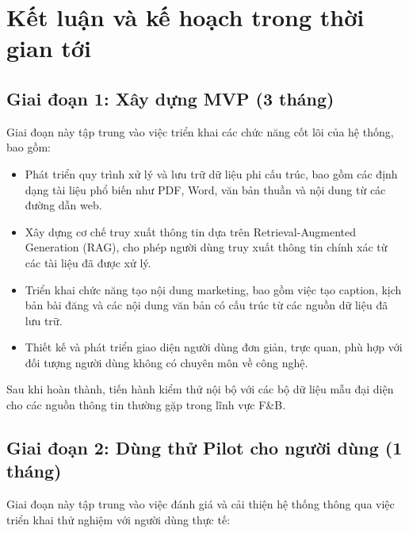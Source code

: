\chapter{Kết luận và kế hoạch trong thời gian
tới}\label{kux1ebft-luux1eadn-vuxe0-kux1ebf-houx1ea1ch-trong-thux1eddi-gian-tux1edbi}

\section{Giai đoạn 1: Xây dựng MVP (3
tháng)}\label{giai-ux111oux1ea1n-1-xuxe2y-dux1ef1ng-mvp-3-thuxe1ng}

Giai đoạn này tập trung vào việc triển khai các chức năng cốt lõi của hệ
thống, bao gồm:

\begin{itemize}
\item
  Phát triển quy trình xử lý và lưu trữ dữ liệu phi cấu trúc, bao gồm
  các định dạng tài liệu phổ biến như PDF, Word, văn bản thuần và nội
  dung từ các đường dẫn web.
\item
  Xây dựng cơ chế truy xuất thông tin dựa trên Retrieval-Augmented
  Generation (RAG), cho phép người dùng truy xuất thông tin chính xác từ
  các tài liệu đã được xử lý.
\item
  Triển khai chức năng tạo nội dung marketing, bao gồm việc tạo caption,
  kịch bản bài đăng và các nội dung văn bản có cấu trúc từ các nguồn dữ
  liệu đã lưu trữ.
\item
  Thiết kế và phát triển giao diện người dùng đơn giản, trực quan, phù
  hợp với đối tượng người dùng không có chuyên môn về công nghệ.
\end{itemize}

Sau khi hoàn thành, tiến hành kiểm thử nội bộ với các bộ dữ liệu mẫu đại
diện cho các nguồn thông tin thường gặp trong lĩnh vực F\&B.

\section{Giai đoạn 2: Dùng thử Pilot cho người dùng (1
tháng)}\label{giai-ux111oux1ea1n-2-duxf9ng-thux1eed-pilot-cho-ngux1b0ux1eddi-duxf9ng-1-thuxe1ng}

Giai đoạn này tập trung vào việc đánh giá và cải thiện hệ thống thông
qua việc triển khai thử nghiệm với người dùng thực tế:

